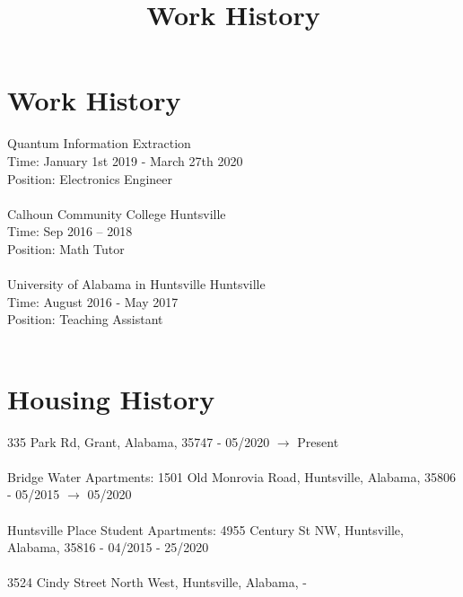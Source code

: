\documentclass[]{article}
\title{Work History}
\begin{document}
\maketitle
\noindent
\section{Work History}
Quantum Information Extraction \\
Time: January 1st 2019 - March 27th 2020 \\ 
Position: Electronics Engineer \\ \\
Calhoun Community College Huntsville
\\
Time: Sep 2016 – 2018 \\
Position:  Math Tutor
\\ \\
University of Alabama in Huntsville Huntsville
\\
Time: August 2016 - May 2017 \\
Position: Teaching Assistant
 \\ \\
\section{Housing History}
335 Park Rd, Grant, Alabama, 35747 - 05/2020 $\to$ Present \\ \\
Bridge Water Apartments: 1501 Old Monrovia Road, Huntsville, Alabama, 35806 - 05/2015 $\to$ 05/2020 \\ \\
Huntsville Place Student Apartments: 4955 Century St NW, Huntsville, Alabama, 35816 - 04/2015 - 25/2020 \\ \\
3524 Cindy Street North West, Huntsville, Alabama,  - 
\end{document}
